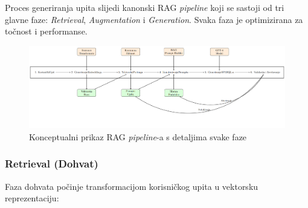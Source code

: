 Proces generiranja upita slijedi kanonski RAG \textit{pipeline} koji se sastoji od tri glavne faze: \textit{Retrieval}, \textit{Augmentation} i \textit{Generation}. Svaka faza je optimizirana za točnost i performanse.

\begin{figure}[htbp]
    \centering
    \includegraphics[width=1\textwidth]{figures/rag_pipeline.png}
    \caption{Konceptualni prikaz RAG \textit{pipeline}-a s detaljima svake faze}
    \label{fig:rag_pipeline_detailed}
\end{figure}

\subsubsection{Retrieval (Dohvat)}

Faza dohvata počinje transformacijom korisničkog upita u vektorsku reprezentaciju:

